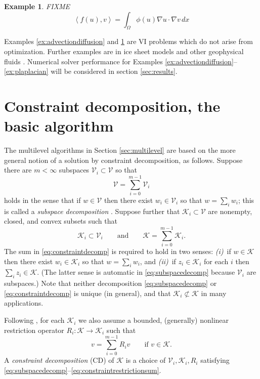 \documentclass[letterpaper,final,12pt,reqno]{amsart}
\theoremstyle{cstyle}
\theoremstyle{dstyle}
\newtheorem{example}[theorem]{Example}
\numberwithin{equation}{section}
\numberwithin{figure}{section}
\numberwithin{table}{section}
\numberwithin{theorem}{section}
\newcommand{\grad}{\nabla}
\newcommand{\cK}{\mathcal{K}}
\newcommand{\cV}{\mathcal{V}}
\newcommand{\ip}[2]{\left<#1,#2\right>}
\begin{document}
\begin{example}  \label{ex:porousgeneralization}  FIXME
\begin{equation}
\ip{f(u)}{v} = \int_\Omega \phi(u) \grad u \cdot \grad v\,dx \label{eq:porousgeneralization}
\end{equation}
\end{example}

Examples \ref{ex:advectiondiffusion} and \ref{ex:porousgeneralization} are VI problems which do not arise from optimization.  Further examples are in ice sheet models \cite{Calvoetal2002,JouvetBueler2012} and other geophysical fluids \cite{Bueler2021conservation}.  Numerical solver performance for Examples \ref{ex:advectiondiffusion}--\ref{ex:plaplacian} will be considered in section \ref{sec:results}.  %


\section{Constraint decomposition, the basic algorithm} \label{sec:cd}

The multilevel algorithms in Section \ref{sec:multilevel} are based on the more general notion of a solution by constraint decomposition, as follows.  Suppose there are $m<\infty$ subspaces $\cV_i \subset \cV$ so that
\begin{equation}
\cV = \sum_{i=0}^{m-1} \cV_i \label{eq:subspacedecomp}
\end{equation}
holds in the sense that if $w \in \cV$ then there exist $w_i \in \cV_i$ so that $w = \sum_i w_i$; this is called a \emph{subspace decomposition} \cite{Xu1992}.  Suppose further that $\cK_i \subset \cV$ are nonempty, closed, and convex subsets such that
\begin{equation}
\cK_i \subset \cV_i \qquad \text{and} \qquad \cK = \sum_{i=0}^{m-1} \cK_i. \label{eq:constraintdecomp}
\end{equation}
The sum in \eqref{eq:constraintdecomp} is required to hold in two senses: \emph{(i)}~if $w \in \cK$ then there exist $w_i \in \cK_i$ so that $w = \sum_i w_i$, and \emph{(ii)}~if $z_i \in \cK_i$ for each $i$ then $\sum_i z_i \in \cK$.  (The latter sense is automatic in \eqref{eq:subspacedecomp} because $\cV_i$ are subspaces.)  Note that neither decomposition \eqref{eq:subspacedecomp} or \eqref{eq:constraintdecomp} is unique (in general), and that $\cK_i \not\subset \cK$ in many applications.

Following \cite{Tai2003}, for each $\cK_i$ we also assume a bounded, (generally) nonlinear restriction operator $R_i : \cK \to \cK_i$ such that
\begin{equation}
v = \sum_{i=0}^{m-1} R_i v \qquad \text{if } v \in \cK.  \label{eq:constraintrestrictionsum}
\end{equation}
A \emph{constraint decomposition} (CD) of $\cK$ is a choice of $\cV_i,\cK_i,R_i$ satisfying \eqref{eq:subspacedecomp}--\eqref{eq:constraintrestrictionsum}.
\end{document}
